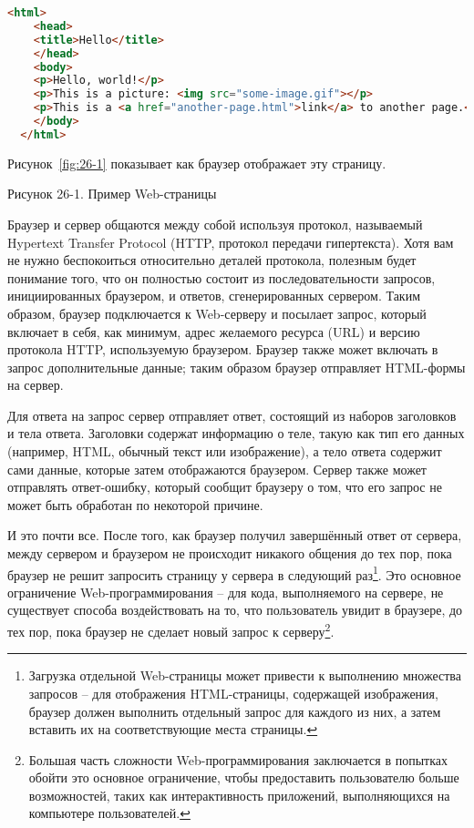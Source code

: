 \begin{lstlisting}[language=HTML]
  <html>
    <head>
    <title>Hello</title>
    </head>
    <body>
    <p>Hello, world!</p>
    <p>This is a picture: <img src="some-image.gif"></p>
    <p>This is a <a href="another-page.html">link</a> to another page.</p>
    </body>
  </html>
\end{lstlisting}

Рисунок~\ref{fig:26-1} показывает как браузер отображает эту страницу.

Рисунок 26-1. Пример Web-страницы

Браузер и сервер общаются между собой используя протокол, называемый Hypertext Transfer
Protocol (HTTP, протокол передачи гипертекста). Хотя вам не нужно беспокоиться
относительно деталей протокола, полезным будет понимание того, что он полностью состоит из
последовательности запросов, инициированных браузером, и ответов, сгенерированных
сервером. Таким образом, браузер подключается к Web-серверу и посылает запрос, который
включает в себя, как минимум, адрес желаемого ресурса (URL) и версию протокола HTTP,
используемую браузером. Браузер также может включать в запрос дополнительные данные; таким
образом браузер отправляет HTML-формы на сервер.

Для ответа на запрос сервер отправляет ответ, состоящий из наборов заголовков и тела
ответа. Заголовки содержат информацию о теле, такую как тип его данных (например, HTML,
обычный текст или изображение), а тело ответа содержит сами данные, которые затем
отображаются браузером. Сервер также может отправлять ответ-ошибку, который сообщит
браузеру о том, что его запрос не может быть обработан по некоторой причине.

И это почти все. После того, как браузер получил завершённый ответ от сервера, между
сервером и браузером не происходит никакого общения до тех пор, пока браузер не решит
запросить страницу у сервера в следующий раз\footnote{Загрузка отдельной Web-страницы
  может привести к выполнению множества запросов -- для отображения HTML-страницы,
  содержащей изображения, браузер должен выполнить отдельный запрос для каждого из них, а
  затем вставить их на соответствующие места страницы.}. Это основное ограничение
Web-программирования -- для кода, выполняемого на сервере, не существует способа
воздействовать на то, что пользователь увидит в браузере, до тех пор, пока браузер не
сделает новый запрос к серверу\footnote{Большая часть сложности Web-программирования
  заключается в попытках обойти это основное ограничение, чтобы предоставить пользователю
  больше возможностей, таких как интерактивность приложений, выполняющихся на компьютере
  пользователей.}.

